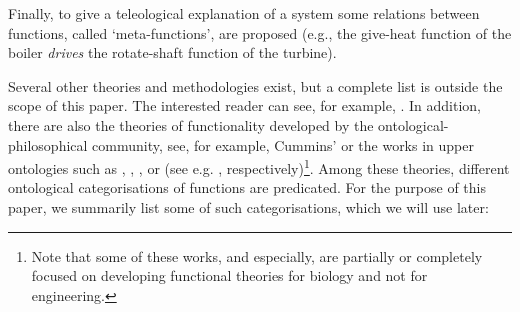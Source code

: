 \documentclass[
]{ceurart}
\begin{document}
\begin{itemize}
    Finally, to give a teleological explanation of a system some relations between functions, called `meta-functions', are proposed (e.g., the give-heat function of the boiler \textit{drives} the rotate-shaft function of the turbine). 
\end{itemize}

Several other theories and methodologies exist, but a complete list is outside the scope of this paper. The interested reader can see, for example, \cite{umedaFunctionBehaviourStructure1990,qianFunctionBehaviorStructure1996, zhaoStateBehaviorFunction2019}.
In addition, there are also the theories of functionality developed by the ontological-philosophical community, see, for example, Cummins'\cite{cumminsFunctionalAnalysis1975} or the works in upper ontologies such as \BFO, \GFO, \YAMATO, or \DOLCE (see e.g. \cite{spearFunctionsBasicFormal2016, herreGeneralFormalOntology2006, sasajimaFBRLFunctionBehavior1995, borgoFormalOntologicalPerspective2009}, respectively)\footnote{Note that some of these works, \BFO and \GFO especially, are partially or completely focused on developing functional theories for biology and not for engineering.}.
Among these theories, different ontological categorisations of functions are predicated. 
For the purpose of this paper, we summarily list some of such categorisations, which we will use later:
\end{document}
